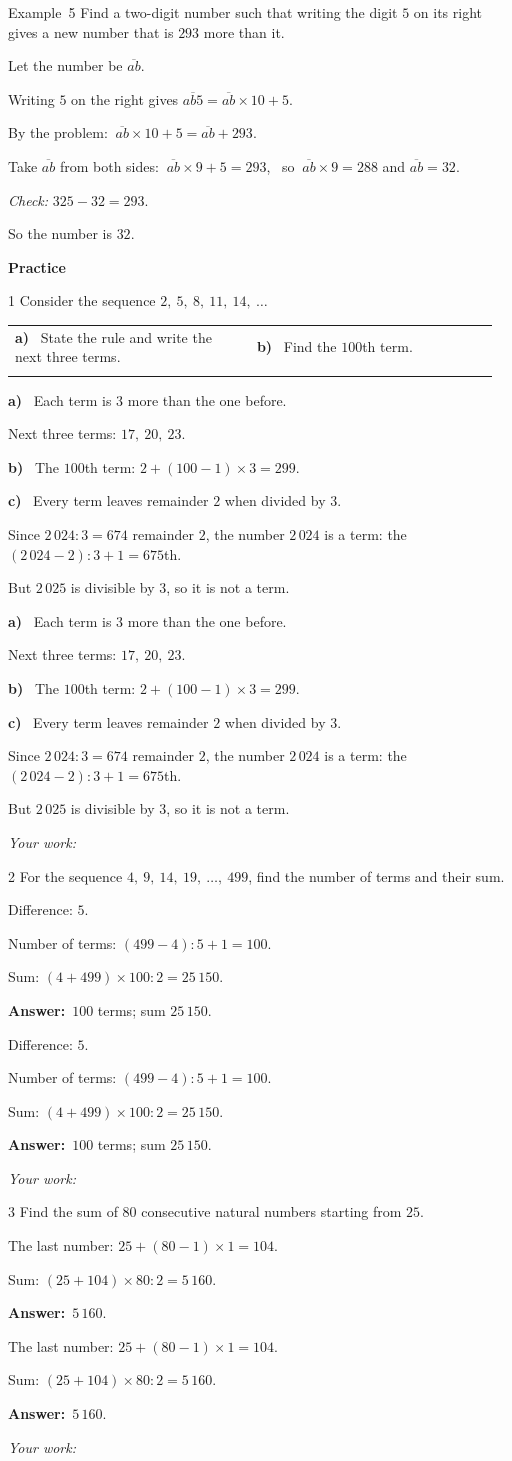 \documentclass[11pt]{article}
\makeatletter
\newif\ifsol \soltrue
\renewcommand{\arraystretch}{1.35}
\providecommand{\AnsWord}{Đáp số}
\newcommand{\dapso}[1]{\par\textbf{\AnsWord:}\ #1}
\newcommand{\guide}{\par\vspace{4pt}{\bfseries\color{tmBlue}\GuideWord}\par\vspace{3pt}\nopagebreak}
\newcommand{\probsol}[1]{%
  \begin{lrbox}{\solmeasure}\begin{minipage}{\dimexpr\linewidth-24pt\relax}#1\end{minipage}\end{lrbox}%
  \ifsol
    \begin{solbox}#1\end{solbox}%
  \else
    \setlength{\solht}{\dimexpr\ht\solmeasure+\dp\solmeasure+0.85cm\relax}%
    \ifdim\solht<1.35cm\setlength{\solht}{1.35cm}\fi
    \begin{tcolorbox}[colback=white,colframe=Line,boxrule=0.8pt,arc=5pt,
      left=8pt,right=8pt,top=4pt,bottom=4pt,height=\solht]{\footnotesize\color{Slate}\itshape\WorkWord}\end{tcolorbox}%
  \fi}
\newcommand{\dividerbar}[1]{\par\vspace{0.6em}\noindent
  \begin{tcolorbox}[enhanced,frame hidden,interior hidden,borderline west={5pt}{0pt}{ProbBlue},
    colback=white,left=12pt,right=12pt,top=5pt,bottom=5pt,arc=4pt]
  {\large\bfseries\color{ProbBlue} #1}\end{tcolorbox}\vspace{0.4em}}
\newcommand{\nd}[1]{\overline{#1}}
\newcommand{\pa}[1]{\textbf{#1)}\ }
\newenvironment{cols2}{\par\vspace{3pt}\noindent\setlength{\tabcolsep}{0pt}\renewcommand{\arraystretch}{1.3}%
  \begin{tabular}{@{}>{\raggedright\arraybackslash\rule{0pt}{4.4ex}}p{0.48\linewidth}<{\rule[-2.3ex]{0pt}{0pt}}@{\hspace{0.03\linewidth}}>{\raggedright\arraybackslash\rule{0pt}{4.4ex}}p{0.48\linewidth}<{\rule[-2.3ex]{0pt}{0pt}}@{}}}%
  {\end{tabular}\par}
\newcommand{\gap}{\vspace{0.3cm}}
\def\GuideWord{Guided solution.}
\def\WorkWord{Your work:}
\def\AnsWord{Answer}
\def\ExWord{Example}
\makeatother
\begin{document}
\gap
\begin{exbox}{\ExWord\ 5}
Find a two-digit number such that writing the digit $5$ on its right gives a new number that is $293$ more than it.
\guide
Let the number be $\nd{ab}$.\par Writing $5$ on the right gives $\nd{ab5}=\nd{ab}\times10+5$.\par
By the problem: $\ \nd{ab}\times10+5=\nd{ab}+293$.\par
Take $\nd{ab}$ from both sides: $\ \nd{ab}\times9+5=293$, \ so $\ \nd{ab}\times9=288$ and $\nd{ab}=32$.\par
\emph{Check:} $325-32=293$.\par So the number is $32$.
\end{exbox}
\dividerbar{Practice}
\begin{probbox}{1}{\relax}
Consider the sequence $2,\ 5,\ 8,\ 11,\ 14,\ \dots$
\begin{cols2}
\pa{a} State the rule and write the next three terms. & \pa{b} Find the $100$th term.\\
\multicolumn{2}{@{}l@{}}{\pa{c} Do $2\,024$ and $2\,025$ belong to the sequence? If so, which term is it?}
\end{cols2}
\end{probbox}
\probsol{
\pa{a} Each term is $3$ more than the one before.\par Next three terms: $17,\ 20,\ 23$.\par
\pa{b} The $100$th term: $2+(100-1)\times3=299$.\par
\pa{c} Every term leaves remainder $2$ when divided by $3$.\par Since $2\,024:3=674$ remainder $2$, the number $2\,024$ is a term: the $(2\,024-2):3+1=675$th.\par But $2\,025$ is divisible by $3$, so it is not a term.
}
\gap
\begin{probbox}{2}{\relax}
For the sequence $4,\ 9,\ 14,\ 19,\ \dots,\ 499$, find the number of terms and their sum.
\end{probbox}
\probsol{
Difference: $5$.\par Number of terms: $(499-4):5+1=100$.\par
Sum: $(4+499)\times100:2=25\,150$.
\dapso{$100$ terms; sum $25\,150$.}}
\gap
\begin{probbox}{3}{\relax}
Find the sum of $80$ consecutive natural numbers starting from $25$.
\end{probbox}
\probsol{
The last number: $25+(80-1)\times1=104$.\par
Sum: $(25+104)\times80:2=5\,160$.
\dapso{$5\,160$.}}
\end{document}
